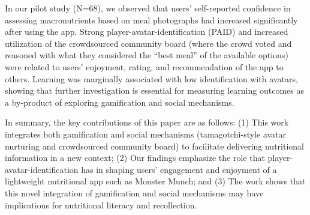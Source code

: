 

In our pilot study (N=68), we observed that users' self-reported confidence in assessing macronutrients based on meal photographs had increased significantly after using the app. Strong player-avatar-identification (PAID) and increased utilization of the crowdsourced community board (where the crowd voted and reasoned with what they considered the ``best meal'' of the available options) were related to users' enjoyment, rating, and recommendation of the app to others. Learning was marginally associated with low identification with avatars, showing that further investigation is essential for measuring learning outcomes as a by-product of exploring gamification and social mechanisms.

In summary, the key contributions of this paper are as follows: (1) This work integrates 
both gamification and social mechanisms (tamagotchi-style avatar nurturing and crowdsourced community board) to facilitate delivering nutritional information in a new context; (2) Our findings emphasize the role that player-avatar-identification has in shaping users' engagement and enjoyment of a lightweight nutritional app such as Monster Munch; and (3) The work shows that this novel integration of gamification and social mechanisms may have implications for nutritional literacy and recollection.








